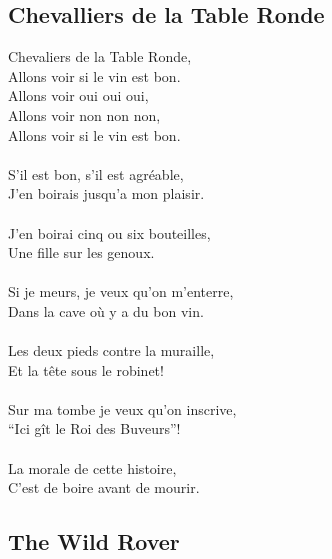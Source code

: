 \documentclass[a5paper]{article}
\begin{document}
\newpage

\subsection{Chevalliers de la Table Ronde} %
\label{sub:chevalliers_de_la_table_ronde}

Chevaliers de la Table Ronde,       \\
Allons voir si le vin est bon.            \\
Allons voir oui oui oui,                   \\
Allons voir non non non, 	            \\
Allons voir si le vin est bon.          \\
\\
S'il est bon, s'il est agréable,\\
J'en boirais jusqu'a mon plaisir.\\
\\
J’en boirai cinq ou six bouteilles,\\
Une fille sur les genoux.\\
\\
Si je meurs, je veux qu'on m'enterre,\\
Dans la cave où y a du bon vin.\\
\\
Les deux pieds contre la muraille,\\
Et la tête sous le robinet!\\
\\
Sur ma tombe je veux qu'on inscrive,\\
``Ici g\^{i}t le Roi des Buveurs''! \\
\\
La morale de cette histoire,\\
C’est de boire avant de mourir.  \\


\subsection{The Wild Rover} %
\label{sub:the_wild_rover}
\end{document}

